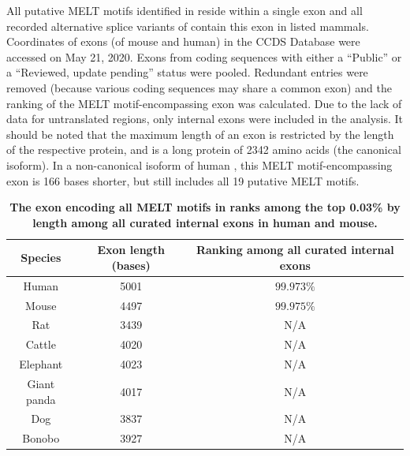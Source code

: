 \begin{table}[H]
    \renewcommand{\arraystretch}{1.5}
    \caption{\textbf{The exon encoding all MELT motifs in  ranks among the top 0.03\% by length among all curated internal exons in human and mouse.}}
    \noindent\justifying All putative MELT motifs identified in \cite{MELTEvolution} reside within a single exon and all recorded alternative splice variants of  contain this exon in listed mammals. Coordinates of exons (of mouse and human) in the CCDS Database \cite{CCDS} were accessed on May 21, 2020. Exons from coding sequences with either a ``Public'' or a ``Reviewed, update pending'' status were pooled. Redundant entries were removed (because various coding sequences may share a common exon) and the ranking of the MELT motif-encompassing exon was calculated. Due to the lack of data for untranslated regions, only internal exons were included in the analysis. It should be noted that the maximum length of an exon is restricted by the length of the respective protein, and  is a long protein of \SI{2342}{} amino acids (the canonical isoform). In a non-canonical isoform of human , this MELT motif-encompassing exon is 166 bases shorter, but still includes all 19 putative MELT motifs.
    \label{ExonLength}
    \begin{center}
        \begin{tabular}{c c c}
            \hline
            Species & Exon length (bases) & Ranking among all curated internal exons\\
            \hline
            Human & 5001 & $99.973\%$\\
            Mouse & 4497 & $99.975\%$\\
            Rat & 3439 & N/A\\
            Cattle & 4020 & N/A\\
            Elephant & 4023 & N/A\\ %
            Giant panda & 4017 & N/A\\
            Dog & 3837 & N/A\\
            Bonobo & 3927 & N/A\\
            \hline
        \end{tabular}
    \end{center}
\end{table}


